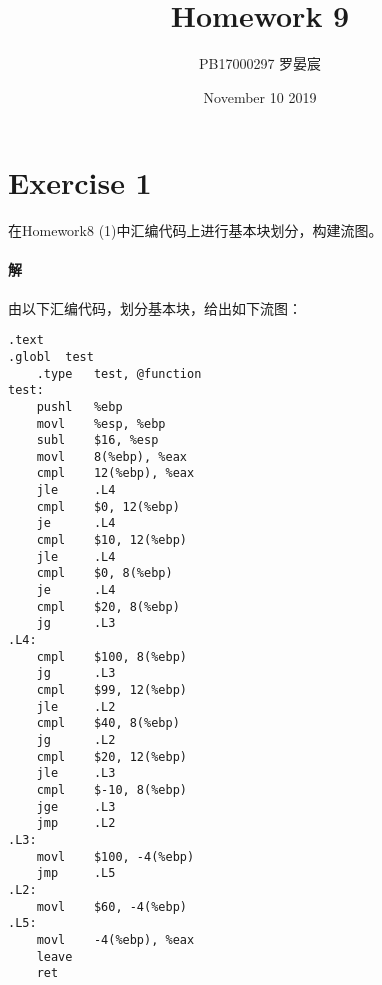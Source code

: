 \documentclass{article}
\title{Homework 9}
\author{PB17000297 罗晏宸}
\date{November 10 2019}
\begin{document}
\maketitle

\section*{Exercise 1}
在Homework8 (1)中汇编代码上进行基本块划分，构建流图。


\begin{multicols}{2}

\paragraph{解}
由以下汇编代码，划分基本块，给出如下流图：

\begin{lstlisting}[style = Assembler, lineskip = 0.2em]
.text
.globl  test
    .type   test, @function
test:
    pushl   %ebp
    movl    %esp, %ebp
    subl    $16, %esp
    movl    8(%ebp), %eax
    cmpl    12(%ebp), %eax
    jle     .L4
    cmpl    $0, 12(%ebp)
    je      .L4
    cmpl    $10, 12(%ebp)
    jle     .L4
    cmpl    $0, 8(%ebp)
    je      .L4
    cmpl    $20, 8(%ebp)
    jg      .L3
.L4:
    cmpl    $100, 8(%ebp)
    jg      .L3
    cmpl    $99, 12(%ebp)
    jle     .L2
    cmpl    $40, 8(%ebp)
    jg      .L2
    cmpl    $20, 12(%ebp)
    jle     .L3
    cmpl    $-10, 8(%ebp)
    jge     .L3
    jmp     .L2
.L3:
    movl    $100, -4(%ebp)
    jmp     .L5
.L2:
    movl    $60, -4(%ebp)
.L5:
    movl    -4(%ebp), %eax
    leave
    ret
        \end{lstlisting}
\end{multicols}
\end{document}

